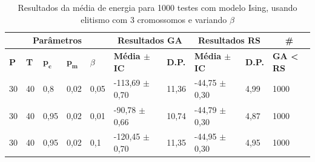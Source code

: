 \begin{table}[h!]
	\centering
	\begin{tabular}{|l|l|l|l|l|l|l|l|l|l|}
		\hline
		\multicolumn{5}{|c|}{\textbf{Parâmetros}}                                                    & \multicolumn{2}{c|}{\textbf{Resultados GA}}                                        & \multicolumn{2}{c|}{\textbf{Resultados RS}}                                        & \multicolumn{1}{c|}{\textbf{\#}}                      \\ \hline
		\textbf{P} & \textbf{T} & $\bm{p_c}$ & $\bm{p_m}$ & $\beta$ & \textbf{Média $\pm$ IC} & \textbf{D.P.} & \textbf{Média $\pm$ IC} & \textbf{D.P.} & \textbf{GA < RS} \\ \hline
		30                          & 40                          & 0,8        & 0,02  & 0,05      & -113,69 $\pm$ 0,70                           & 11,36                          & -44,75 $\pm$ 0,30                            & 4,99                           & 1000                                      \\ \hline
		30                          & 40                          & 0,95        & 0,02 & 0,01      & -90,78 $\pm$ 0,66                            & 10,74                          & -44,79 $\pm$ 0,30                            & 4,87                           & 1000                                      \\ \hline
		30                          & 40                          & 0,95        & 0,02 & 0,1      & -120,45 $\pm$ 0,70                            & 11,35                          & -44,95 $\pm$ 0,30                            & 4,95                           & 1000                                      \\ \hline
	\end{tabular}
	\caption{Resultados da média de energia para 1000 testes com modelo Ising, usando elitismo com 3 cromossomos e variando \(\beta\)}
	\label{tab:resultados_teste5}
\end{table}

